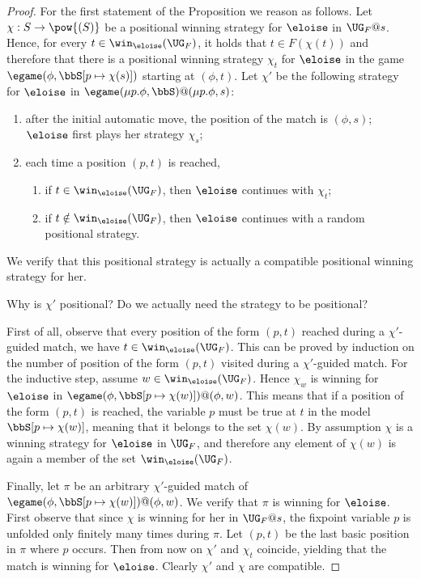 \begin{proof}
For the first statement of the Proposition we reason as follows. 
Let $\chi: S \to \pow{(S)}$  be a positional winning strategy for $\eloise$ in $\UG_F@s$. 
Hence, for every $t \in \win_{\eloise}(\UG_{F})$, it holds that $t \in F(\chi(t))$ 
and therefore that there is a positional winning strategy $\chi_t$ for $\eloise$ 
in the game $\egame(\phi,\bbS[p \mapsto \chi(s)])$ starting at $(\phi,t)$. 
Let $\chi'$ be the following strategy for $\eloise$ in
$\egame(\mu p.\phi,\bbS)@(\mu p.\phi,s)$:
\begin{enumerate}
\item after the initial automatic move, the position of the match is $(\phi,s)$; 
$\eloise$ first plays her strategy $\chi_s$;
\item each time a position $(p,t)$ is reached, 
\begin{enumerate}
\item if $t \in \win_{\eloise}(\UG_{F})$, then $\eloise$ continues with $\chi_t$;
\item if $t \notin \win_{\eloise}(\UG_{F})$, then $\eloise$ continues with a random positional strategy.
\end{enumerate}
\end{enumerate}
We verify that this positional strategy is actually a compatible positional 
winning strategy for her.

\btbs
\item
Why is $\chi'$ positional?
Do we actually need the strategy to be positional?
\etbs

First of all, observe that every position of the form $(p,t)$ reached during
a $\chi'$-guided match, we have $t \in \win_{\eloise}(\UG_{F})$. 
This can be proved by induction on the number of position of the form $(p,t)$
visited during a $\chi'$-guided match. 
For the inductive step, assume $w \in \win_{\eloise}(\UG_{F})$. 
Hence $\chi_w$ is winning for $\eloise$ in  $\egame(\phi,\bbS[p \mapsto 
  \chi(w)])@(\phi,w)$. 
This means that if a position of the form $(p, t)$ is reached, the variable $p$ 
must be true at $t$ in the model $\bbS[p \mapsto \chi(w)]$, meaning that it
belongs to the set $\chi(w)$.
By assumption $\chi$ is a winning strategy for $\eloise$ in $\UG_F$, and 
therefore any element of $\chi(w)$ is again a member of the set 
$\win_{\eloise}(\UG_{F})$. 

Finally, let $\pi$ be an arbitrary $\chi'$-guided match of $\egame(\phi,
\bbS[p \mapsto \chi(w)])@(\phi,w)$. 
We verify that $\pi$ is winning for $\eloise$. 
First observe that since $\chi$ is winning for her in $\UG_F@s$, the fixpoint 
variable $p$ is unfolded only finitely many times during $\pi$. 
Let $(p,t)$ be the last basic position in $\pi$ where $p$ occurs. 
Then from now on $\chi'$ and $\chi_t$ coincide, yielding  that the match is 
winning for $\eloise$. Clearly $\chi'$ and $\chi$ are compatible.


\end{proof}
